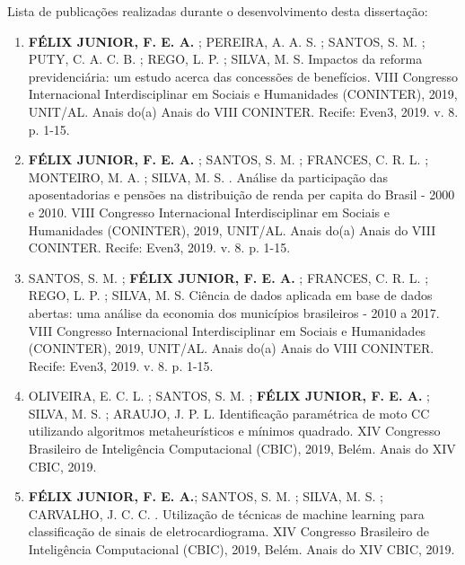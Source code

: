 \begin{agradecimentos}

Lista de publicações realizadas durante o desenvolvimento desta dissertação:

\begin{enumerate}[label=(\roman*)]
    \item \textbf{FÉLIX JUNIOR, F. E. A.} ; PEREIRA, A. A. S. ; SANTOS, S. M. ; PUTY, C. A. C. B. ; REGO, L. P. ; SILVA, M. S. Impactos da reforma previdenciária: um estudo acerca das concessões de benefícios. VIII Congresso Internacional Interdisciplinar em Sociais e Humanidades (CONINTER), 2019, UNIT/AL. Anais do(a) Anais do VIII CONINTER. Recife: Even3, 2019. v. 8. p. 1-15.
    
    \item \textbf{FÉLIX JUNIOR, F. E. A.} ; SANTOS, S. M. ; FRANCES, C. R. L. ; MONTEIRO, M. A. ; SILVA, M. S. . Análise da participação das aposentadorias e pensões na distribuição de renda per capita do Brasil - 2000 e 2010. VIII Congresso Internacional Interdisciplinar em Sociais e Humanidades (CONINTER), 2019, UNIT/AL. Anais do(a) Anais do VIII CONINTER. Recife: Even3, 2019. v. 8. p. 1-15.
    
    \item SANTOS, S. M. ; \textbf{FÉLIX JUNIOR, F. E. A.} ; FRANCES, C. R. L. ; REGO, L. P. ; SILVA, M. S. Ciência de dados aplicada em base de dados abertas: uma análise da economia dos municípios brasileiros - 2010 a 2017. VIII Congresso Internacional Interdisciplinar em Sociais e Humanidades (CONINTER), 2019, UNIT/AL. Anais do(a) Anais do VIII CONINTER. Recife: Even3, 2019. v. 8. p. 1-15.
    
    \item OLIVEIRA, E. C. L. ; SANTOS, S. M. ; \textbf{FÉLIX JUNIOR, F. E. A.} ; SILVA, M. S. ; ARAUJO, J. P. L. Identificação paramétrica de moto CC utilizando algoritmos metaheurísticos e mínimos quadrado. XIV Congresso Brasileiro de Inteligência Computacional (CBIC), 2019, Belém. Anais do XIV CBIC, 2019.
    
    \item \textbf{FÉLIX JUNIOR, F. E. A.}; SANTOS, S. M. ; SILVA, M. S. ; CARVALHO, J. C. C. . Utilização de técnicas de machine learning para classificação de sinais de eletrocardiograma. XIV Congresso Brasileiro de Inteligência Computacional (CBIC), 2019, Belém. Anais do XIV CBIC, 2019.
\end{enumerate}

\end{agradecimentos}
